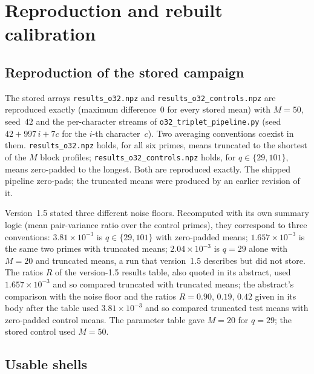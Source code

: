 \documentclass[12pt,a4paper]{article}
\theoremstyle{definition}
\theoremstyle{remark}
\begin{document}
  \section{Reproduction and rebuilt calibration}
  \label{sec:calibration}

  \subsection{Reproduction of the stored campaign}

    The stored arrays \texttt{results\_o32.npz} and \texttt{results\_o32\_controls.npz} are
    reproduced exactly (maximum difference~$0$ for every stored mean) with $M=50$, seed~$42$ and the
    per-character streams of \texttt{o32\_triplet\_pipeline.py} (seed $42+997\,i+7c$ for the $i$-th
    character~$c$).
    Two averaging conventions coexist in them.
    \texttt{results\_o32.npz} holds, for all six primes, means truncated to the shortest of the $M$
    block profiles; \texttt{results\_o32\_controls.npz} holds, for $q\in\{29,101\}$, means
    zero-padded to the longest.
    Both are reproduced exactly.
    The shipped pipeline zero-pads; the truncated means were produced by an earlier revision of it.

    Version~1.5 stated three different noise floors.
    Recomputed with its own summary logic (mean pair-variance ratio over the control primes), they
    correspond to three conventions:
    $3.81\times10^{-3}$ is $q\in\{29,101\}$ with zero-padded means;
    $1.657\times10^{-3}$ is the same two primes with truncated means;
    $2.04\times10^{-3}$ is $q=29$ alone with $M=20$ and truncated means, a run that version~1.5
    describes but did not store.
    The ratios $R$ of the version-1.5 results table, also quoted in its abstract, used
    $1.657\times10^{-3}$ and so compared truncated with truncated means; the abstract's comparison with
    the noise floor and the ratios $R=0.90$, $0.19$, $0.42$ given in its body after the table used
    $3.81\times10^{-3}$ and so compared truncated test means with zero-padded control means.
    The parameter table gave $M=20$ for $q=29$; the stored control used $M=50$.

  \subsection{Usable shells}
\end{document}
